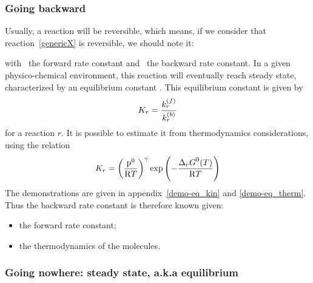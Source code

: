 \subsubsection{Going backward}

Usually, a reaction will be reversible, which means, if we consider
that reaction~\ref{genericX} is reversible, we should note it:
\begin{chemicalEquation}
\label{genericXrev}
\end{chemicalEquation}
with \fwdratecons\ the forward rate constant and \bkwdratecons\ the backward rate constant.
In a given physico-chemical environment, this reaction will eventually reach
steady state, characterized by an equilibrium constant \Eqconst. 
This equilibrium constant is given by
\begin{equation}
\Eqconst[r] = \frac{\fwdratecons[r]}{\bkwdratecons[r]}
\label{therm:K_kin}
\end{equation}
for a reaction $r$.
It is possible to estimate it from thermodynamics considerations, 
using the relation
\begin{equation}
\Eqconst[r] = \left(\frac{\pz}{\Rg \Temp}\right)^\gamma \exp\left(-\frac{\DGibbsZ[r](\Temp)}{\Rg \Temp}\right)
\label{therm:K_therm}
\end{equation}
The demonstrations are given in appendix~\ref{demo-eq_kin} and \ref{demo-eq_therm}. 
Thus the backward rate constant is therefore known given:
\begin{itemize}
\item the forward rate constant;
\item the thermodynamics of the molecules.
\end{itemize}

\subsubsection{Going nowhere: steady state, a.k.a equilibrium}
\label{phys:equilibrium}


